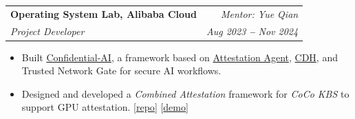 \documentclass[letterpaper,11pt]{article}
\makeatletter
\newcommand{\resumeItem}[1]{
  \item\small{
    {#1 \vspace{-2pt}}
  }
}
\newcommand{\resumeSubheading}[4]{
  \vspace{-2pt}\item
    \begin{tabular*}{0.97\textwidth}[t]{l@{\extracolsep{\fill}}r}
      \textbf{#1} & #2 \\
      \textit{\small#3} & \textit{\small #4} \\
    \end{tabular*}\vspace{-7pt}
}
\newcommand{\resumeItemListStart}{\begin{itemize}}
\newcommand{\resumeItemListEnd}{\end{itemize}\vspace{-5pt}}
\makeatother
\begin{document}
        \resumeSubheading
      {Operating System Lab, Alibaba Cloud}{\textit{Mentor: Yue Qian}}
      {Project Developer}{Aug 2023 \textbf{--} Nov 2024}
        \resumeItemListStart
            \resumeItem{Built \href{https://github.com/inclavare-containers/Confidential-AI}{Confidential-AI}, a framework based on \href{https://github.com/confidential-containers/guest-components/tree/main/attestation-agent}{Attestation Agent}, \href{https://github.com/confidential-containers/guest-components/tree/main/confidential-data-hub}{CDH}, and Trusted Network Gate for secure AI workflows.}
            \resumeItem{Designed and developed a \textit{Combined Attestation} framework for \textit{CoCo KBS} to support GPU attestation. [\href{https://github.com/jingyao-zhang/demo-combined-attestation}{repo}]
            [\href{https://www.youtube.com/watch?v=PUM6HVjNAm8}{demo}]}
        \resumeItemListEnd
    
    
\end{document}
